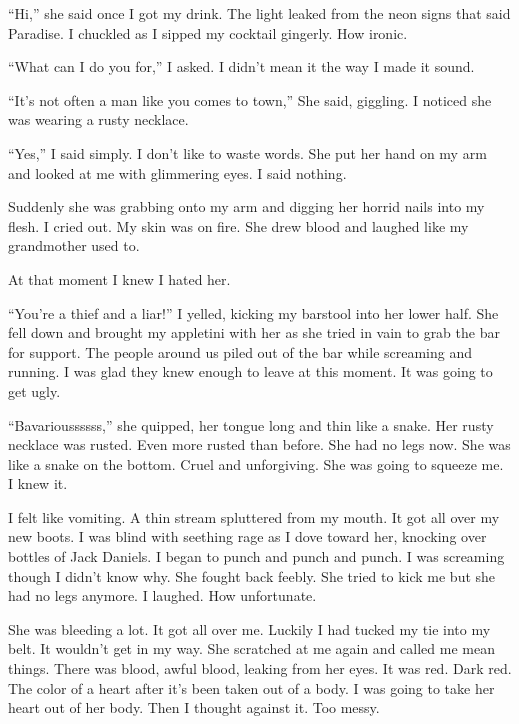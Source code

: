 ``Hi,'' she said once I got my drink. The light leaked
from the neon signs that said {\sc Paradise}. I chuckled as
I sipped my cocktail gingerly. How ironic.

``What can I do you for,'' I asked. I didn't mean
it the way I made it sound.

``It's not often a man like you comes to town,''
She said, giggling. I noticed she was wearing a rusty
necklace.

``Yes,'' I said simply. I don't like to waste
words. She put her hand on my arm and looked at me with glimmering
eyes. I said nothing.

Suddenly she was grabbing onto my arm and digging her horrid nails
into my flesh. I cried out. My skin was on fire. She drew blood and
laughed like my grandmother used to.

At that moment I knew I hated her.



``You're a thief and a liar!'' I yelled, kicking my
barstool into her lower half. She fell down and brought my
appletini with her as she tried in vain to grab the bar for
support. The people around us piled out of the bar while screaming
and running. I was glad they knew enough to leave at this moment.
It was going to get ugly.

``Bavarioussssss,'' she quipped, her tongue long and thin
like a snake. Her rusty necklace was rusted. Even more rusted than
before. She had no legs now. She was like a snake on the bottom.
Cruel and unforgiving. She was going to squeeze me. I knew
it.



I felt like vomiting. A thin stream spluttered from my mouth. It
got all over my new boots. I was blind with seething rage as I dove
toward her, knocking over bottles of Jack Daniels. I began to punch
and punch and punch. I was screaming though I didn't know
why. She fought back feebly. She tried to kick me but she had no
legs anymore. I laughed. How unfortunate.



She was bleeding a lot. It got all over me. Luckily I had tucked my
tie into my belt. It wouldn't get in my way. She scratched at
me again and called me mean things. There was blood, awful blood,
leaking from her eyes. It was red. Dark red. The color of a heart
after it's been taken out of a body. I was going to take her
heart out of her body. Then I thought against it. Too messy.



